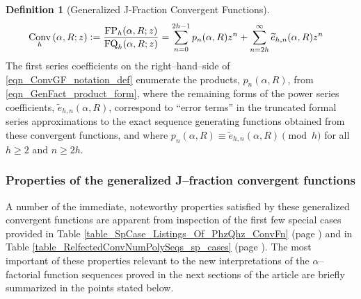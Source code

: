 \documentclass[12pt,reqno]{article}
\numberwithin{sfootnote}{section}
\newcommand{\tableref}[1]{Table \ref{#1} (page \pageref{#1})}
\numberwithin{equation}{section}
\theoremstyle{plain}
\theoremstyle{definition}
\newtheorem{definition}[theorem]{Definition}
\theoremstyle{remark}
\newcommand{\quotetext}[1]{``#1''}
\newcommand{\defequals}{\ensuremath{\vcentcolon=}}
\newcommand{\pn}[3]{\ensuremath{p_{#1}\left(#2, #3\right)}}
\newcommand{\ConvGF}[4]{\ensuremath{\Conv_{#1}\left(#2, #3; #4\right)}}
\DeclareMathOperator{\FP}{FP}
\DeclareMathOperator{\FQ}{FQ}
\DeclareMathOperator{\Conv}{Conv}
\begin{document}
\begin{definition}[Generalized J-Fraction Convergent Functions]
\begin{align}
\label{eqn_ConvGF_notation_def} 
\ConvGF{h}{\alpha}{R}{z} & \defequals 
     \frac{\FP_h(\alpha, R; z)}{\FQ_h(\alpha, R; z)} = 
     \sum_{n=0}^{2h-1} p_n(\alpha, R) z^n + 
     \sum_{n=2h}^{\infty} \widetilde{e}_{h,n}(\alpha, R) z^n 
\end{align} 
The first series coefficients on the right--hand--side of 
\eqref{eqn_ConvGF_notation_def} enumerate the products, 
$p_n(\alpha, R)$, from \eqref{eqn_GenFact_product_form}, where the 
remaining forms of the power series coefficients, 
$\widetilde{e}_{h,n}(\alpha, R)$, 
correspond to \quotetext{error terms} in the 
truncated formal series approximations to the 
exact sequence generating functions 
obtained from these convergent functions, and where 
$\pn{n}{\alpha}{R} \equiv \widetilde{e}_{h,n}(\alpha, R) \pmod{h}$ 
for all $h \geq 2$ and $n \geq 2h$. 
\end{definition} 

\subsubsection{Properties of the generalized J--fraction convergent functions} 

A number of the immediate, noteworthy properties satisfied by these 
generalized convergent functions 
are apparent from inspection of the first few special cases provided in 
\tableref{table_SpCase_Listings_Of_PhzQhz_ConvFn} and in 
\tableref{table_RelfectedConvNumPolySeqs_sp_cases}. 
The most important of these properties relevant 
to the new interpretations of the 
$\alpha$--factorial function sequences proved in the next sections of the 
article are briefly summarized in the points stated below. 
\end{document}
